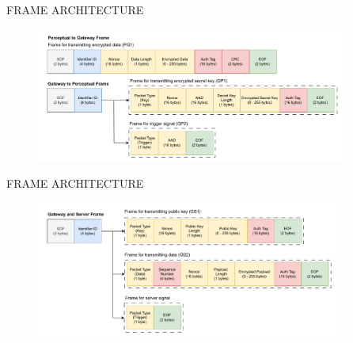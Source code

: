 \begin{frame}{FRAME ARCHITECTURE}
    \vspace{-0.32cm}
    \begin{figure}
    	\centering
    	\includegraphics[width=0.92\textwidth]{pic/frame1.pdf}
    \end{figure}
\end{frame}

\begin{frame}{FRAME ARCHITECTURE}
    \vspace{-0.3cm}
    \begin{figure}
    	\centering
    	\includegraphics[width=0.9\textwidth]{pic/frame2.pdf}
    \end{figure}
\end{frame}



